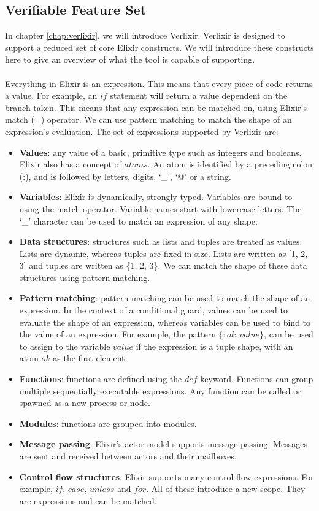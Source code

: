 \subsection{Verifiable Feature Set} \label{sec:verifiable_feature_set}
In chapter \ref{chap:verlixir}, we will introduce Verlixir. Verlixir is designed to support a reduced set of core Elixir constructs. We will introduce these constructs here to give an overview of what the tool is capable of supporting.
\\ \\
Everything in Elixir is an expression. This means that every piece of code returns a value. For example, an $if$ statement will return a value dependent on the branch taken. This means that any expression can be matched on, using Elixir's match (=) operator. We can use pattern matching to match the shape of an expression's evaluation. The set of expressions supported by Verlixir are:
\begin{itemize}
    \item \textbf{Values}: any value of a basic, primitive type such as integers and booleans. Elixir also has a concept of $atoms$. An atom is identified by a preceding colon (:), and is followed by letters, digits, `\_', `@' or a string.
    \item \textbf{Variables}: Elixir is dynamically, strongly typed. Variables are bound to using the match operator. Variable names start with lowercase letters. The `\_' character can be used to match an expression of any shape.
    \item \textbf{Data structures}: structures such as lists and tuples are treated as values. Lists are dynamic, whereas tuples are fixed in size. Lists are written as [1, 2, 3] and tuples are written as \{1, 2, 3\}. We can match the shape of these data structures using pattern matching.
    \item \textbf{Pattern matching}: pattern matching can be used to match the shape of an expression. In the context of a conditional guard, values can be used to evaluate the shape of an expression, whereas variables can be used to bind to the value of an expression. For example, the pattern $\{:ok, value\}$, can be used to assign to the variable $value$ if the expression is a tuple shape, with an atom $ok$ as the first element.
    \item \textbf{Functions}: functions are defined using the $def$ keyword. Functions can group multiple sequentially executable expressions. Any function can be called or spawned as a new process or node.
    \item \textbf{Modules}: functions are grouped into modules.
    \item \textbf{Message passing}: Elixir's actor model supports message passing. Messages are sent and received between actors and their mailboxes.
    \item \textbf{Control flow structures}: Elixir supports many control flow expressions. For example, $if$, $case$, $unless$ and $for$. All of these introduce a new scope. They are expressions and can be matched.
\end{itemize}
